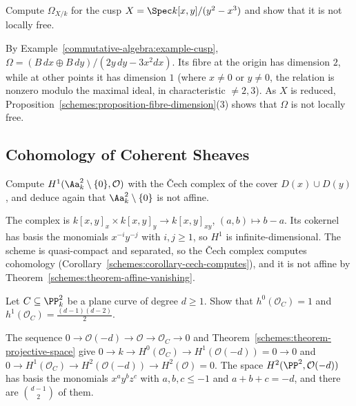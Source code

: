 \begin{exercise}\label{schemes:exercise-differentials-cusp}
Compute $\Omega_{X/k}$ for the cusp $X = \Spec k[x, y]/(y^2 - x^3)$ and show that it is not locally free.
\end{exercise}

\begin{solution}
By Example~\ref{commutative-algebra:example-cusp}, $\Omega = (B\,dx \oplus B\,dy)/(2y\,dy - 3x^2dx)$. Its fibre at the origin has dimension $2$, while at other
points it has dimension $1$ (where $x \neq 0$ or $y \neq 0$, the relation is nonzero modulo the maximal ideal, in characteristic $\neq 2, 3$). As $X$ is
reduced, Proposition~\ref{schemes:proposition-fibre-dimension}(3) shows that $\Omega$ is not locally free.
\end{solution}

\subsection{Cohomology of Coherent Sheaves}\label{schemes:subsection-exercises-coherent-cohomology}

\begin{exercise}\label{schemes:exercise-punctured-plane}
Compute $H^1(\Aa^2_k \setminus \{0\}, \mathcal{O})$ with the \v{C}ech complex of the cover $D(x) \cup D(y)$, and deduce again that $\Aa^2_k \setminus \{0\}$ is not affine.
\end{exercise}

\begin{solution}
The complex is $k[x, y]_x \times k[x, y]_y \to k[x, y]_{xy}$, $(a, b) \mapsto b - a$. Its cokernel has basis the monomials $x^{-i}y^{-j}$ with $i, j \geq 1$, so $H^1$ is
infinite-dimensional. The scheme is quasi-compact and separated, so the \v{C}ech complex computes cohomology
(Corollary~\ref{schemes:corollary-cech-computes}), and it is not affine by Theorem~\ref{schemes:theorem-affine-vanishing}.
\end{solution}

\begin{exercise}\label{schemes:exercise-plane-curve-cohomology}
Let $C \subseteq \PP^2_k$ be a plane curve of degree $d \geq 1$. Show that $h^0(\mathcal{O}_C) = 1$ and $h^1(\mathcal{O}_C) = \frac{(d-1)(d-2)}{2}$.
\end{exercise}

\begin{solution}
The sequence $0 \to \mathcal{O}(-d) \to \mathcal{O} \to \mathcal{O}_C \to 0$ and Theorem~\ref{schemes:theorem-projective-space} give
$0 \to k \to H^0(\mathcal{O}_C) \to H^1(\mathcal{O}(-d)) = 0 \to 0$ and $0 \to H^1(\mathcal{O}_C) \to H^2(\mathcal{O}(-d)) \to H^2(\mathcal{O}) = 0$. The space $H^2(\PP^2, \mathcal{O}(-d))$ has
basis the monomials $x^ay^bz^c$ with $a, b, c \leq -1$ and $a + b + c = -d$, and there are $\binom{d-1}{2}$ of them.
\end{solution}

